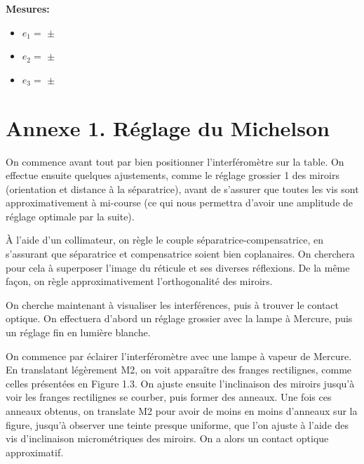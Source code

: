 \documentclass[french]{article}
\begin{document}
\begin{theo}
	\textbf{Mesures:}\vspace{.5cm}
	\begin{itemize}
		\item $e_1 =$  $\pm$
		\item $e_2 =$  $\pm$
		\item $e_3 =$  $\pm$
	\end{itemize}
\end{theo}

\section{Annexe 1. Réglage du Michelson}


On commence avant tout par bien positionner l’interféromètre sur la table. On effectue ensuite quelques ajustements, comme le réglage grossier 1 des miroirs (orientation et distance à la séparatrice), avant de s’assurer que toutes les vis sont approximativement à mi-course (ce qui nous permettra d’avoir une amplitude de réglage optimale par la suite).\vspace{.5cm}

À l’aide d’un collimateur, on règle le couple séparatrice-compensatrice, en s’assurant que séparatrice et compensatrice soient bien coplanaires. On cherchera pour cela à superposer l’image du réticule et ses diverses réflexions.
De la même façon, on règle approximativement l’orthogonalité des miroirs.\vspace{.5cm}

On cherche maintenant à visualiser les interférences, puis à trouver le contact optique. On effectuera d’abord un réglage grossier avec la lampe à Mercure, puis un réglage fin en lumière blanche.\vspace{.5cm}

On commence par éclairer l’interféromètre avec une lampe à vapeur de Mercure. En translatant légèrement M2, on voit apparaître des franges rectilignes, comme celles présentées
en Figure 1.3. On ajuste ensuite l’inclinaison des miroirs jusqu’à voir les franges rectilignes se
courber, puis former des anneaux. Une fois ces anneaux obtenus, on translate M2 pour avoir de moins en moins d’anneaux sur la
figure, jusqu’à observer une teinte presque uniforme, que l’on ajuste à l’aide des vis d’inclinaison micrométriques des miroirs. On a alors un contact optique approximatif.\vspace{.5cm}
\end{document}
